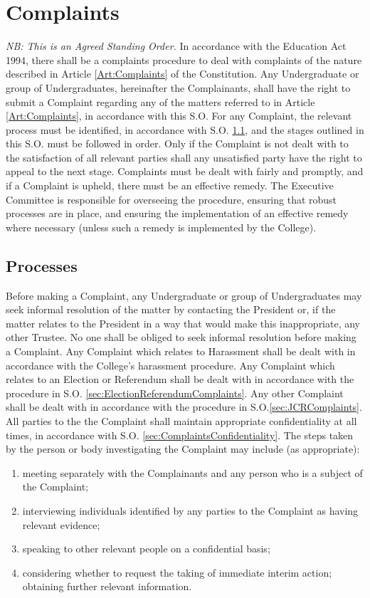 \chapter{Complaints} \label{ch:complaints}
\textit{NB: This is an Agreed Standing Order.}
\npara In accordance with the Education Act 1994, there shall be a complaints procedure to deal with complaints of the nature described in Article \ref{Art:Complaints} of the Constitution.
\npara Any Undergraduate or group of Undergraduates, hereinafter the Complainants, shall have the right to submit a Complaint regarding any of the matters referred to in Article \ref{Art:Complaints}, in accordance with this S.O.
\npara For any Complaint, the relevant process must be identified, in accordance with S.O. \ref{sec:ComplaintsProcess}, and the stages outlined in this S.O. must be followed in order.  Only if the Complaint is not dealt with to the satisfaction of all relevant parties shall any unsatisfied party have the right to appeal to the next stage.
\npara Complaints must be dealt with fairly and promptly, and if a Complaint is upheld, there must be an effective remedy.  The Executive Committee is responsible for overseeing the procedure, ensuring that robust processes are in place, and ensuring the implementation of an effective remedy where necessary (unless such a remedy is implemented by the College).
\section{Processes} \label{sec:ComplaintsProcess}
\npara Before making a Complaint, any Undergraduate or group of Undergraduates may seek informal resolution of the matter by contacting the President or, if the matter relates to the President in a way that would make this inappropriate, any other Trustee.  No one shall be obliged to seek informal resolution before making a Complaint.
\npara Any Complaint which relates to Harassment shall be dealt with in accordance with the College's harassment procedure.
\npara Any Complaint which relates to an Election or Referendum shall be dealt with in accordance with the procedure in S.O. \ref{sec:ElectionReferendumComplaints}.
\npara Any other Complaint shall be dealt with in accordance with the procedure in S.O.\ref{sec:JCRComplaints}.
\npara All parties to the the Complaint shall maintain appropriate confidentiality at all times, in accordance with S.O. \ref{sec:ComplaintsConfidentiality}.
\npara The steps taken by the person or body investigating the Complaint may include (as appropriate):
\begin{enumerate}
\item meeting separately with the Complainants and any person who is a subject of the Complaint;
\item interviewing individuals identified by any parties to the Complaint as having relevant evidence;
\item speaking to other relevant people on a confidential basis;
\item considering whether to request the taking of immediate interim action;
obtaining further relevant information.
\end{enumerate}
